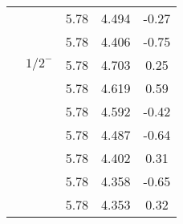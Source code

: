 \documentclass[prd,twocolumn,floatfix,nofootinbib]{revtex4}
\begin{document}
\begin{table*}[!htbp]
\begin{tabular}{ccccc}
            &               &5.78   &4.494 &-0.27  \\
            &               &5.78   &4.406 &-0.75  \\
            &${1/2}^{-}$    &5.78   &4.703 &0.25  \\
            &               &5.78   &4.619 &0.59  \\
            &               &5.78   &4.592 &-0.42  \\
            &               &5.78   &4.487 &-0.64  \\
            &               &5.78   &4.402 &0.31 \\
            &               &5.78   &4.358 &-0.65  \\
            &               &5.78   &4.353 &0.32  \\
        \hline\hline
    \end{tabular}
\end{table*}
\end{document}
